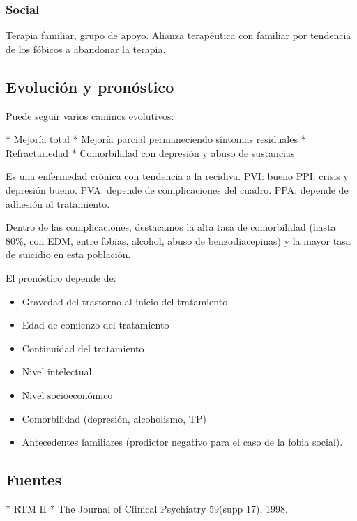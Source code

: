 \subsubsection*{Social}
Terapia familiar, grupo de apoyo. Alianza terapéutica con familiar por tendencia de los fóbicos a abandonar la terapia.

\subsection*{Evolución y pronóstico}

Puede seguir varios caminos evolutivos:

* Mejoría total
* Mejoría parcial permaneciendo síntomas residuales
* Refractariedad
* Comorbilidad con depresión y abuso de sustancias

Es una enfermedad crónica con tendencia a la recidiva. PVI: bueno PPI: crisis y depresión bueno. PVA: depende de complicaciones del cuadro. PPA: depende de adhesión al tratamiento.

Dentro de las complicaciones, destacamos la alta tasa de comorbilidad (hasta 80\%, con EDM, entre fobias, alcohol, abuso de benzodiacepinas) y la mayor tasa de suicidio en esta población.

El pronóstico depende de:
\begin{itemize}
	\item Gravedad del trastorno al inicio del tratamiento
	\item Edad de comienzo del tratamiento
	\item Continuidad del tratamiento
	\item Nivel intelectual
	\item Nivel socioeconómico
	\item Comorbilidad (depresión, alcoholismo, TP)
	\item Antecedentes familiares (predictor negativo para el caso de la fobia social).
\end{itemize}
\subsection*{Fuentes}
* RTM II
* The Journal of Clinical Psychiatry 59(supp 17), 1998.
